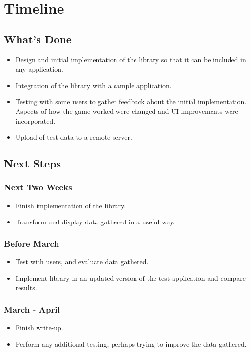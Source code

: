 

\chapter{Timeline}

\section{What's Done}

\begin{itemize}
\item
Design and initial implementation of the library so that it can be included in any application.
\item
Integration of the library with a sample application.
\item
Testing with some users to gather feedback about the initial implementation. Aspects of how the game worked were changed and UI improvements were incorporated.
\item
Upload of test data to a remote server.
\end{itemize}

\section{Next Steps}

\subsection{Next Two Weeks}
\begin{itemize}
\item
Finish implementation of the library.
\item
Transform and display data gathered in a useful way.
\end{itemize}

\subsection{Before March}
\begin{itemize}
\item
Test with users, and evaluate data gathered.
\item
Implement library in an updated version of the test application and compare results.
\end{itemize}

\subsection{March - April}
\begin{itemize}
\item
Finish write-up.
\item
Perform any additional testing, perhaps trying to improve the data gathered.
\end{itemize}
